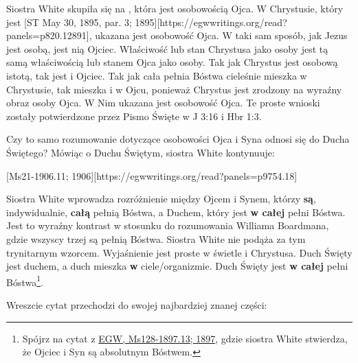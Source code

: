 Siostra White skupiła się na , która jest osobowością Ojca. W Chrystusie, który jest [ST May 30, 1895, par. 3; 1895][https://egwwritings.org/read?panels=p820.12891], ukazana jest osobowość Ojca. W taki sam sposób, jak Jezus jest osobą, jest nią Ojciec. Właściwość lub stan Chrystusa jako osoby jest tą samą właściwością lub stanem Ojca jako osoby. Tak jak Chrystus jest osobową istotą, tak jest i Ojciec. Tak jak cała pełnia Bóstwa cieleśnie mieszka w Chrystusie, tak mieszka i w Ojcu, ponieważ Chrystus jest zrodzony na wyraźny obraz osoby Ojca. W Nim ukazana jest osobowość Ojca. Te proste wnioski zostały potwierdzone przez Pismo Święte w J 3:16 i Hbr 1:3.

Czy to samo rozumowanie dotyczące osobowości Ojca i Syna odnosi się do Ducha Świętego? Mówiąc o Duchu Świętym, siostra White kontynuuje:

[Ms21-1906.11; 1906][https://egwwritings.org/read?panels=p9754.18]

Siostra White wprowadza rozróżnienie między Ojcem i Synem, którzy \textbf{są}, indywidualnie, \textbf{całą} pełnią Bóstwa, a Duchem, który jest \textbf{w całej} pełni Bóstwa. Jest to wyraźny kontrast w stosunku do rozumowania Williama Boardmana, gdzie wszyscy trzej są pełnią Bóstwa. Siostra White nie podąża za tym trynitarnym wzorcem. Wyjaśnienie jest proste w świetle  i Chrystusa. Duch Święty jest duchem, a duch mieszka \textbf{w} ciele/organizmie. Duch Święty jest \textbf{w całej} pełni Bóstwa\footnote{Spójrz na cytat z \href{https://egwwritings.org/?ref=en_Ms128-1897.13&para=5426.19}{{EGW, Ms128-1897.13; 1897}}, gdzie siostra White stwierdza, że Ojciec i Syn są absolutnym Bóstwem.}.

Wreszcie cytat przechodzi do swojej najbardziej znanej części:

